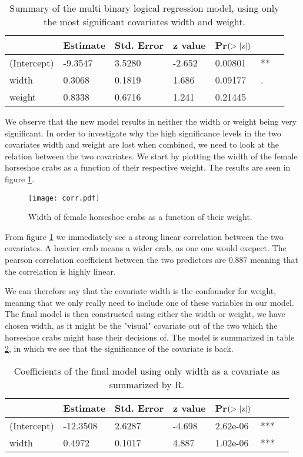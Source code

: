 \documentclass[a4paper, 10pt, reqno]{amsart}
\begin{document}
\begin{table}
\caption{Summary of the multi binary logical regression model, using only the most significant covariates width and weight.}
\label{tab: 4}
\begin{tabular}{lllllll}
\hline\hline
 & Estimate  & Std. Error & z value & Pr$(>\abs{\mathrm{z}})$ & \\ \hline
(Intercept) & -9.3547    & 3.5280 & -2.652 & 0.00801& **\\
width   &      0.3068   &  0.1819  & 1.686 & 0.09177 &. \\
weight   &     0.8338   &  0.6716&   1.241 & 0.21445  & \\
\hline
\end{tabular}
\end{table}

We observe that the new model results in neither the width or weight being very significant. In order to investigate why the high significance levels in the two covariates width and weight are lost when combined, we need to look at the relation between the two covariates. We start by plotting the width of the female horseshoe crabs as a function of their respective weight. The results are seen in figure \ref{fig: corr}.

\begin{figure}
    \centering
    \texttt{[image: corr.pdf]}
    \caption{Width of female horseshoe crabs as a function of their weight.}
    \label{fig: corr}
\end{figure}

From figure \ref{fig: corr} we immediately see a strong linear correlation between the two covariates. A heavier crab means a wider crab, as one one would excpect. The pearson correlation coefficient between the two predictors are 0.887 meaning that the correlation is highly linear. 

We can therefore say that the covariate width is the confounder for weight, meaning that we only really need to include one of these variables in our model. The final model is then constructed using either the width or weight, we have chosen width, as it might be the "visual" covariate out of the two which the horseshoe crabs might base their decisions of. The model is summarized in table \ref{tab: final}, in which we see that the significance of the covariate is back.

\begin{table}
\caption{Coefficients of the final model using only width as a covariate as summarized by R.}
\label{tab: final}
\begin{tabular}{lllllll}
\hline\hline
 & Estimate  & Std. Error & z value & Pr$(>\abs{\mathrm{z}})$ & \\ \hline
(Intercept)& -12.3508  &   2.6287&  -4.698& 2.62e-06& ***\\
width     &    0.4972  &   0.1017 &  4.887 &1.02e-06& ***\\
\hline
\end{tabular}
\end{table}
\end{document}
